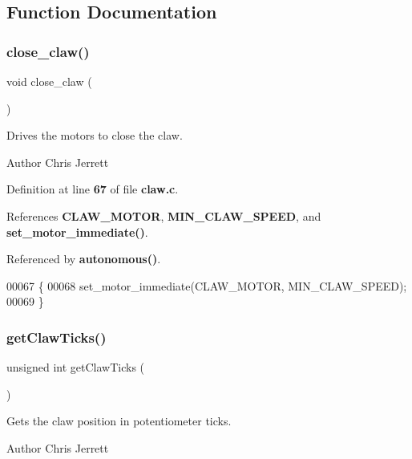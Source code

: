 \subsection{Function Documentation}
\mbox{\label{claw_8h_ac42dd40dbb37219295286859c6b068c2}} 
\subsubsection{close\+\_\+claw()}
{\footnotesize\ttfamily void close\+\_\+claw (\begin{DoxyParamCaption}{ }\end{DoxyParamCaption})}



Drives the motors to close the claw. 

\begin{DoxyAuthor}{Author}
Chris Jerrett 
\end{DoxyAuthor}


Definition at line \textbf{ 67} of file \textbf{ claw.\+c}.



References \textbf{ C\+L\+A\+W\+\_\+\+M\+O\+T\+OR}, \textbf{ M\+I\+N\+\_\+\+C\+L\+A\+W\+\_\+\+S\+P\+E\+ED}, and \textbf{ set\+\_\+motor\+\_\+immediate()}.



Referenced by \textbf{ autonomous()}.


\begin{DoxyCode}
00067                   \{
00068   set_motor_immediate(CLAW_MOTOR, MIN_CLAW_SPEED);
00069 \}
\end{DoxyCode}
\mbox{\label{claw_8h_addd2004effae7c94400aed1fe6a90ead}} 
\subsubsection{get\+Claw\+Ticks()}
{\footnotesize\ttfamily unsigned int get\+Claw\+Ticks (\begin{DoxyParamCaption}{ }\end{DoxyParamCaption})}



Gets the claw position in potentiometer ticks. 

\begin{DoxyAuthor}{Author}
Chris Jerrett 
\end{DoxyAuthor}


